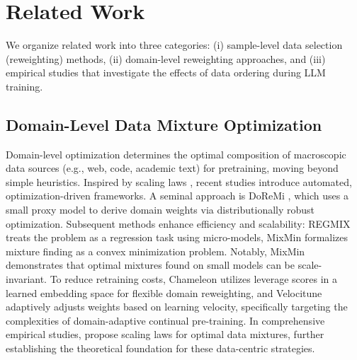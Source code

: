 \section{Related Work}
\label{sec:related_work}

We organize related work into three categories: (i) sample-level data selection (reweighting) methods, (ii) domain-level reweighting approaches, and (iii) empirical studies that investigate the effects of data ordering during LLM training.

\subsection{Domain-Level Data Mixture Optimization}
Domain-level optimization determines the optimal composition of macroscopic data sources (e.g., web, code, academic text) for pretraining, moving beyond simple heuristics. Inspired by scaling laws \citep{kaplan2020scaling}, recent studies introduce automated, optimization-driven frameworks. A seminal approach is DoReMi \citep{doremi}, which uses a small proxy model to derive domain weights via distributionally robust optimization.
Subsequent methods enhance efficiency and scalability: REGMIX \citep{liu2024regmix} treats the problem as a regression task using micro-models, MixMin \citep{DBLP:conf/icml/ThudiRRTM25} formalizes mixture finding as a convex minimization problem. Notably, MixMin demonstrates that optimal mixtures found on small models can be scale-invariant.
To reduce retraining costs, Chameleon \citep{DBLP:conf/icml/XieTC25} utilizes leverage scores in a learned embedding space for flexible domain reweighting, and Velocitune \citep{DBLP:conf/acl/LuoZLLGCC25} adaptively adjusts weights based on learning velocity, specifically targeting the complexities of domain-adaptive continual pre-training.
In comprehensive empirical studies, \citet{DBLP:journals/corr/abs-2507-09404} propose scaling laws for optimal data mixtures, further establishing the theoretical foundation for these data-centric strategies.

